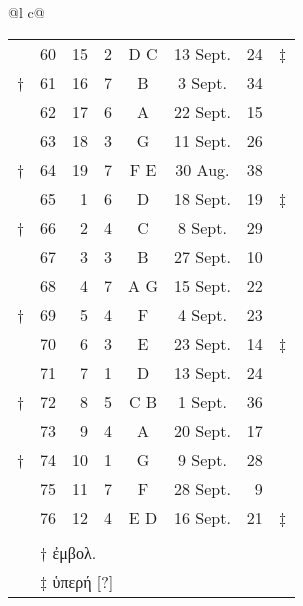 \begin{tabular}{@{}l c@{}}
\begin{tabular}[t]{@{}r rrcccr l@{}}
~ & 60 & 15 &  2 & D C & 13 Sept. & 24 & ‡ \\
\cmidrule{2-7}
† & 61 & 16 &  7 &  B  &  3 Sept. & 34 \\
~ & 62 & 17 &  6 &  A  & 22 Sept. & 15 \\
~ & 63 & 18 &  3 &  G  & 11 Sept. & 26 \\
† & 64 & 19 &  7 & F E & 30 Aug.  & 38 \\
\cmidrule{2-7}
~ & 65 &  1 &  6 &  D  & 18 Sept. & 19 & ‡ \\
† & 66 &  2 &  4 &  C  &  8 Sept. & 29 \\
~ & 67 &  3 &  3 &  B  & 27 Sept. & 10 \\
~ & 68 &  4 &  7 & A G & 15 Sept. & 22 & ~ \\
\cmidrule{2-7}
† & 69 &  5 &  4 &  F  &  4 Sept. & 23 \\
~ & 70 &  6 &  3 &  E  & 23 Sept. & 14 & ‡ \\
~ & 71 &  7 &  1 &  D  & 13 Sept. & 24 \\
† & 72 &  8 &  5 & C B &  1 Sept. & 36 \\
\cmidrule{2-7}
~ & 73 &  9 &  4 &  A  & 20 Sept. & 17 \\
† & 74 & 10 &  1 &  G  &  9 Sept. & 28 \\
~ & 75 & 11 &  7 &  F  & 28 Sept. &  9 \\
~ & 76 & 12 &  4 & E D & 16 Sept. & 21 & ‡ \\
\cmidrule{2-7}
\\
~ & \multicolumn{5}{l}{† \textgreek{ἐμβολ.}}\\
~ & \multicolumn{5}{l}{‡ \textgreek{ὑπερή [?]}}\\
\end{tabular}
\end{tabular}
%
